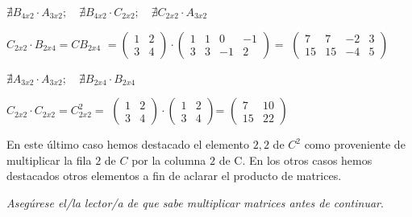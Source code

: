 \begin{ejem}
\noindent $\nexists B_{4x2}\cdot A_{3x2}; \quad \nexists B_{4x2}\cdot C_{2x2}; \quad \nexists C_{2x2}\cdot A_{3x2}$

\noindent $C_{2x2}\cdot B_{2x4}=CB_{2x4}$
\small{$=\left( \begin{matrix}  1&2\\\boxed{3}&\boxed{4} \end{matrix}\right) \cdot
\left( \begin{matrix}  1&1&\boxed{0}&-1 \\ 3&3&\boxed{-1}&2 \end{matrix}\right)$}\normalsize{$=$}
$\left( \begin{matrix} 7&7&-2&3\\15&15&\boxed{-4}&5  \end{matrix}
\right)$

\noindent $\nexists A_{3x2} \cdot A_{3x2}; \quad \nexists B_{2x4} \cdot B_{2x4}$

\noindent $C_{2x2} \cdot C_{2x2}=C^2_{2x2}=$
\small{$\left( \begin{matrix}  1&2\\\boxed{3}&\boxed{4} \end{matrix}\right)\cdot \left( \begin{matrix}  1&\boxed{2}\\3&\boxed{4} \end{matrix}\right)$}\normalsize{=}
$\left( \begin{matrix}  7&10\\15&\boxed{22} \end{matrix}\right)$

En este último caso hemos destacado el elemento $2,2$ de $C^2$ como proveniente de multiplicar la fila $2$ de $C$ por la columna $2$ de C. En los otros casos hemos destacados otros elementos a fin de aclarar el producto de matrices. 

\emph{Asegúrese el/la lector/a de que sabe multiplicar matrices antes de continuar}.
\end{ejem}

